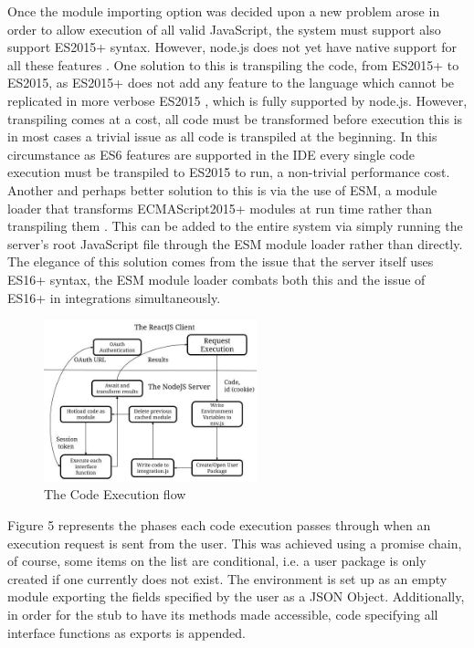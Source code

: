 \documentclass[jou,apacite]{apa6}
\begin{document}
			Once the module importing option was decided upon a new problem arose in order to allow execution of all valid JavaScript, the system must support also support ES2015+ syntax. However, node.js does not yet have native support for all these features \cite{node.js2019}. One solution to this is transpiling the code, from ES2015+ to ES2015, as ES2015+ does not add any feature to the language which cannot be replicated in more verbose ES2015 \cite{Silva2017}, which is fully supported by node.js. However, transpiling comes at a cost, all code must be transformed before execution this is in most cases a trivial issue as all code is transpiled at the beginning. In this circumstance as ES6 features are supported in the IDE every single code execution must be transpiled to ES2015 to run, a non-trivial performance cost. Another and perhaps better solution to this is via the use of ESM, a module loader that transforms ECMAScript2015+ modules at run time rather than transpiling them \cite{powers2018}. This can be added to the entire system via simply running the server's root JavaScript file through the ESM module loader rather than directly. The elegance of this solution comes from the issue that the server itself uses ES16+ syntax,  the ESM module loader combats both this and the issue of ES16+ in integrations simultaneously.
			
				\begin{figure}[h]
\caption{The Code Execution flow}
\centering
\includegraphics[width=0.55\textwidth]{codeexecution}
\end{figure}
			
			Figure 5 represents the phases each code execution passes through when an execution request is sent from the user. This was achieved using a promise chain, of course, some items on the list are conditional, i.e. a user package is only created if one currently does not exist. The environment is set up as an empty module exporting the fields specified by the user as a JSON Object. Additionally, in order for the stub to have its methods made accessible,  code specifying all interface functions as exports is appended.
\end{document}
